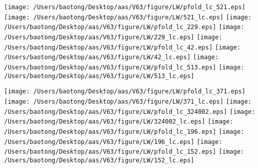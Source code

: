 \documentclass{aastex63}
\begin{document}
\clearpage
\begin{figure*}[!ht]
\centering
\texttt{[image: /Users/baotong/Desktop/aas/V63/figure/LW/pfold\_lc\_521.eps]}
\hfill
\texttt{[image: /Users/baotong/Desktop/aas/V63/figure/LW/521\_lc.eps]}
\hfill
{}
\texttt{[image: /Users/baotong/Desktop/aas/V63/figure/LW/pfold\_lc\_229.eps]}
\hfill
\texttt{[image: /Users/baotong/Desktop/aas/V63/figure/LW/229\_lc.eps]}
\hfill
{}
\texttt{[image: /Users/baotong/Desktop/aas/V63/figure/LW/pfold\_lc\_42.eps]}
\hfill
\texttt{[image: /Users/baotong/Desktop/aas/V63/figure/LW/42\_lc.eps]}
\hfill
{}
\texttt{[image: /Users/baotong/Desktop/aas/V63/figure/LW/pfold\_lc\_513.eps]}
\hfill
\texttt{[image: /Users/baotong/Desktop/aas/V63/figure/LW/513\_lc.eps]}
\hfill
{}
\end{figure*}
\clearpage
\begin{figure*}[!ht]
\centering
\texttt{[image: /Users/baotong/Desktop/aas/V63/figure/LW/pfold\_lc\_371.eps]}
\hfill
\texttt{[image: /Users/baotong/Desktop/aas/V63/figure/LW/371\_lc.eps]}
\hfill
{}
\texttt{[image: /Users/baotong/Desktop/aas/V63/figure/LW/pfold\_lc\_324002.eps]}
\hfill
\texttt{[image: /Users/baotong/Desktop/aas/V63/figure/LW/324002\_lc.eps]}
\hfill
{}
\texttt{[image: /Users/baotong/Desktop/aas/V63/figure/LW/pfold\_lc\_196.eps]}
\hfill
\texttt{[image: /Users/baotong/Desktop/aas/V63/figure/LW/196\_lc.eps]}
\hfill
{}
\texttt{[image: /Users/baotong/Desktop/aas/V63/figure/LW/pfold\_lc\_152.eps]}
\hfill
\texttt{[image: /Users/baotong/Desktop/aas/V63/figure/LW/152\_lc.eps]}
\hfill
{}
\end{figure*}
\end{document}
